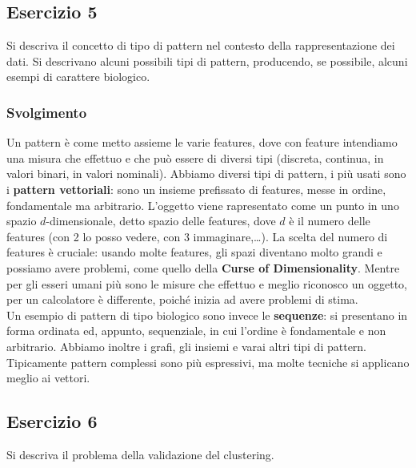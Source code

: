 \documentclass{article}
\begin{document}
\subsection*{Esercizio 5}
Si descriva il concetto di tipo di pattern nel contesto della rappresentazione dei dati. Si descrivano
alcuni possibili tipi di pattern, producendo, se possibile, alcuni esempi di carattere biologico.
\subsubsection*{Svolgimento}
Un pattern è come metto assieme le varie features, dove con feature intendiamo una misura che effettuo e che può essere di diversi tipi (discreta, continua, in valori binari, in valori nominali). Abbiamo diversi tipi di pattern, i più usati sono i \textbf{pattern vettoriali}: sono un insieme prefissato di features, messe in ordine, fondamentale ma arbitrario.
L'oggetto viene rapresentato come un punto in uno spazio $d$-dimensionale, detto spazio delle features, dove $d$ è il numero delle features (con 2 lo posso vedere, con 3 immaginare,\dots). La scelta del numero di features è cruciale: usando molte features, gli spazi diventano molto grandi e possiamo avere problemi, come quello della \textbf{Curse of Dimensionality}. Mentre per gli esseri umani più sono le misure che effettuo e meglio riconosco un oggetto, per un calcolatore è differente, poiché inizia ad avere problemi di stima.\\
Un esempio di pattern di tipo biologico sono invece le \textbf{sequenze}: si presentano in forma ordinata ed, appunto, sequenziale, in cui l'ordine è fondamentale e non arbitrario. Abbiamo inoltre i grafi, gli insiemi e varai altri tipi di pattern. Tipicamente pattern complessi sono più espressivi, ma molte tecniche si applicano meglio ai vettori.

\subsection*{Esercizio 6}
Si descriva il problema della validazione del clustering.
\end{document}

